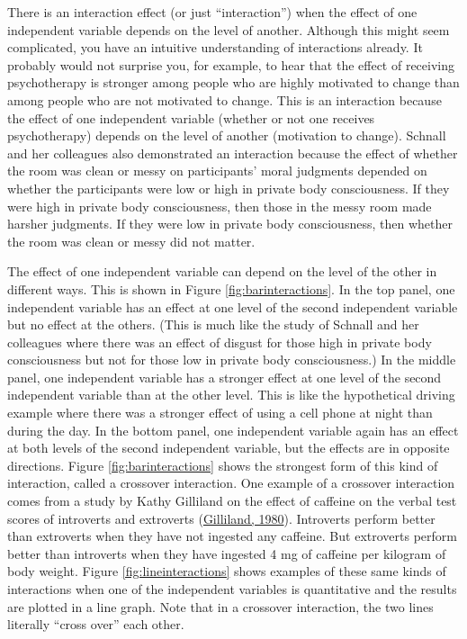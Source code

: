 \documentclass[
]{krantz}
\begin{document}
There is an interaction effect (or just ``interaction'') when the effect of one independent variable depends on the level of another. Although this might seem complicated, you have an intuitive understanding of interactions already. It probably would not surprise you, for example, to hear that the effect of receiving psychotherapy is stronger among people who are highly motivated to change than among people who are not motivated to change. This is an interaction because the effect of one independent variable (whether or not one receives psychotherapy) depends on the level of another (motivation to change). Schnall and her colleagues also demonstrated an interaction because the effect of whether the room was clean or messy on participants' moral judgments depended on whether the participants were low or high in private body consciousness. If they were high in private body consciousness, then those in the messy room made harsher judgments. If they were low in private body consciousness, then whether the room was clean or messy did not matter.

The effect of one independent variable can depend on the level of the other in different ways. This is shown in Figure \ref{fig:barinteractions}. In the top panel, one independent variable has an effect at one level of the second independent variable but no effect at the others. (This is much like the study of Schnall and her colleagues where there was an effect of disgust for those high in private body consciousness but not for those low in private body consciousness.) In the middle panel, one independent variable has a stronger effect at one level of the second independent variable than at the other level. This is like the hypothetical driving example where there was a stronger effect of using a cell phone at night than during the day. In the bottom panel, one independent variable again has an effect at both levels of the second independent variable, but the effects are in opposite directions. Figure \ref{fig:barinteractions} shows the strongest form of this kind of interaction, called a crossover interaction. One example of a crossover interaction comes from a study by Kathy Gilliland on the effect of caffeine on the verbal test scores of introverts and extroverts (\protect\hyperlink{ref-gilliland1980interactive}{Gilliland, 1980}). Introverts perform better than extroverts when they have not ingested any caffeine. But extroverts perform better than introverts when they have ingested 4 mg of caffeine per kilogram of body weight. Figure \ref{fig:lineinteractions} shows examples of these same kinds of interactions when one of the independent variables is quantitative and the results are plotted in a line graph. Note that in a crossover interaction, the two lines literally ``cross over'' each other.
\end{document}
